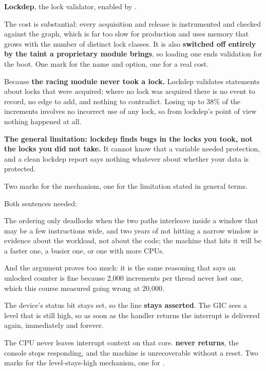 \textbf{Lockdep}, the lock validator, enabled by \textbf{}.

The cost is substantial: every acquisition and release is instrumented and checked against the
graph, which is far too slow for production and uses memory that grows with the number of distinct
lock classes. It is also \textbf{switched off entirely by the taint a proprietary module brings}, so
loading one ends validation for the boot. One mark for the name and option, one for a real cost.

Because \textbf{the racing module never took a lock.} Lockdep validates statements about locks that
were acquired; where no lock was acquired there is no event to record, no edge to add, and nothing
to contradict. Losing up to 38\% of the increments involves no incorrect use of any lock, so from
lockdep's point of view nothing happened at all.

\textbf{The general limitation: lockdep finds bugs in the locks you took, not the locks you did not
take.} It cannot know that a variable needed protection, and a clean lockdep report says nothing
whatever about whether your data is protected.

Two marks for the mechanism, one for the limitation stated in general terms.

Both sentences needed:

The ordering only deadlocks when the two paths interleave inside a window that may be a few
instructions wide, and two years of not hitting a narrow window is evidence about the workload, not
about the code; the machine that hits it will be a faster one, a busier one, or one with more CPUs.

And the argument proves too much: it is the same reasoning that says an unlocked counter is fine
because 2,000 increments per thread never lost one, which this course measured going wrong at
20,000.


The device's status bit stays set, so the line \textbf{stays asserted}. The GIC sees a level that is
still high, so as soon as the handler returns the interrupt is delivered again, immediately and
forever.

The CPU never leaves interrupt context on that core. \textbf{ never returns}, the
console stops responding, and the machine is unrecoverable without a reset. Two marks for the
level-stays-high mechanism, one for .

